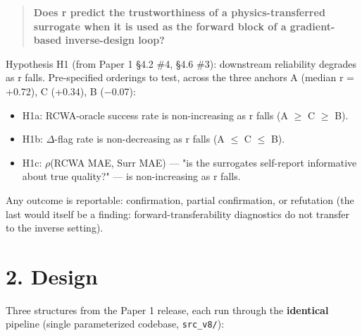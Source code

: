 \documentclass[11pt,a4paper]{article}
\providecommand{\tightlist}{\setlength{\itemsep}{0pt}\setlength{\parskip}{0pt}}
\begin{document}
\begin{quote}
\textbf{Does r predict the trustworthiness of a physics-transferred surrogate when
it is used as the forward block of a gradient-based inverse-design loop?}
\end{quote}

Hypothesis H1 (from Paper 1 \S{}4.2 \#4, \S{}4.6 \#3): downstream reliability degrades
as r falls. Pre-specified orderings to test, across the three anchors
A (median r = +0.72), C (+0.34), B (\ensuremath{-}0.07):

\begin{itemize}
\tightlist
\item
  H1a: RCWA-oracle success rate is non-increasing as r falls (A \ensuremath{\geq} C \ensuremath{\geq} B).
\item
  H1b: \ensuremath{\Delta}-flag rate is non-decreasing as r falls (A \ensuremath{\leq} C \ensuremath{\leq} B).
\item
  H1c: \ensuremath{\rho}(RCWA MAE, Surr MAE) --- "is the surrogate\textquotesingle s self-report informative
  about true quality?" --- is non-increasing as r falls.
\end{itemize}

Any outcome is reportable: confirmation, partial confirmation, or refutation
(the last would itself be a finding: forward-transferability diagnostics do
not transfer to the inverse setting).

\section*{2. Design}

Three structures from the Paper 1 release, each run through the \textbf{identical}
pipeline (single parameterized codebase, \texttt{src\_v8/}):
\end{document}
